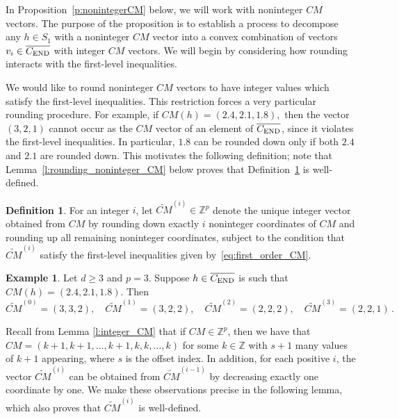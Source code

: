 \documentclass[12pt]{amsart}
\theoremstyle{definition}
\newtheorem{example}[thm]{Example}
\newtheorem{defn}[thm]{Definition}
\numberwithin{equation}{section}
\renewcommand\>{\rangle}
\newcommand\<{\langle}
\newcommand\0{\mathbf{0}}
\newcommand\ZZ{\mathbb{Z}}
\def\wt#1{{\widetilde {#1}}}
\newcommand{\CEND}{C_\textnormal{END}}
\begin{document}
In Proposition~\ref{p:nonintegerCM} below, we will work with noninteger $CM$ vectors. 
The purpose of the proposition is to establish a process to decompose any $h\in S_1$ with a noninteger $CM$ vector into a convex combination of vectors $v_i \in \overline{\CEND}$ with integer $CM$ vectors. 
We will begin by considering how rounding interacts with the first-level inequalities.

We would like to round noninteger $CM$ vectors to have integer values which satisfy the first-level inequalities. 
This restriction forces a very particular rounding procedure. 
For example, if $CM(h)=(2.4,2.1,1.8),$ then the vector $(3,2,1)$ cannot occur as the $CM$ vector of an element of $\overline{\CEND}$, since it violates the first-level inequalities. 
In particular, $1.8$ can be rounded down only if both $2.4$ and $2.1$ are rounded down.
This motivates the following definition; note that Lemma~\ref{l:rounding_noninteger_CM} below proves that Definition~\ref{def:cmround} is well-defined.

\begin{defn}\label{def:cmround}
	For an integer $i$, let $\wt{CM}^{(i)}\in \ZZ^p$ denote the unique integer vector obtained from $CM$ by rounding down exactly $i$ noninteger coordinates of $CM$ and rounding up all remaining noninteger coordinates, subject to the condition that $\wt{CM}^{(i)}$ satisfy the first-level inequalities given by~\eqref{eq:first_order_CM}.
\end{defn} 

\begin{example}
	Let $d \geq 3$ and $p = 3$. Suppose $h \in \overline{\CEND}$ is such that $CM(h) = (2.4, 2.1, 1.8)$. Then
	\[
	\widetilde{CM}^{(0)}=(3,3,2), \quad  \widetilde{CM}^{(1)}=(3,2,2), \quad 
	\widetilde{CM}^{(2)}=(2,2,2), \quad  \widetilde{CM}^{(3)}=(2,2,1) \, .
	\]
\end{example}

Recall from Lemma \ref{l:integer_CM} that if $CM \in \ZZ^p$, then we have that $CM = (k+1,k+1,\dots,k+1, k,k,\dots,k)$ for some $k \in \ZZ$ with $s+1$ many values of $k+1$ appearing, where $s$ is the offset index.
In addition, for each positive $i$, the vector $\wt{CM}^{(i)}$ can be obtained from $\wt{CM}^{(i-1)}$ by decreasing exactly one coordinate by one. 
We make these observations precise in the following lemma, which also proves that $\wt{CM}^{(i)}$ is well-defined.
\end{document}
